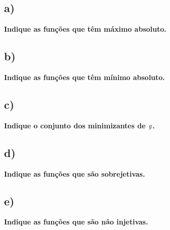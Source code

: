 \documentclass[a4paper]{article}
\begin{document}
\begin{center}
	\label{fig:6j}
\end{center}
\begin{center}
	\label{fig:6k}
\end{center}
\subsection*{a)}
\textbf{Indique as funções que têm máximo absoluto.}
\subsection*{b)}
\textbf{Indique as funções que têm mínimo absoluto.}
\subsection*{c)}
\textbf{Indique o conjunto dos minimizantes de $\it{g}$.}
\text{$\left[\frac{1}{2},1\right[$}
\subsection*{d)}
\textbf{Indique as funções que são sobrejetivas.}
\subsection*{e)}
\textbf{Indique as funções que são não injetivas.}
\end{document}
